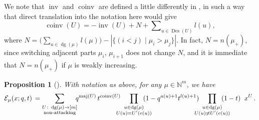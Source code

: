 \documentclass[12pt]{amsart}
\newtheorem{prop}[thm]{Proposition}
\theoremstyle{definition}
\theoremstyle{remark}
\newcommand{\NN}{{\mathbb N}}
\newcommand{\Ecal}{{\mathcal E}}
\DeclareMathOperator{\dg}{dg}
\DeclareMathOperator{\inv}{inv}
\DeclareMathOperator{\coinv}{coinv}
\DeclareMathOperator{\maj}{maj}
\DeclareMathOperator{\Des}{Des}
\begin{document}
We note that $\inv $ and $\coinv $ are defined a little differently in
\cite{HagHaiLo08}, in such a way that direct translation into the
notation here would give
\begin{equation}\label{e:coinv-original}
\coinv (U)  = - \inv (U) + N + \sum \nolimits_{u\in \Des (U)} l(u),
\end{equation}
where $N = \bigl(\sum _{u\in \dg (\mu )} l(\mu ) \bigr) - |\{(i<j)
\mid \mu _{i} >\mu _{j} \}|$.  In fact, $N = n(\mu _{+})$, since
switching adjacent parts $\mu _{i}$, $\mu _{i+1}$ does not change $N$,
and it is immediate that $N = n(\mu _{+})$ if $\mu $ is weakly
increasing.

\begin{prop}[{\cite[Corollary~3.5.2]{HagHaiLo08}}]\label{prop:original-HHL}
With notation as above, for any $\mu \in \NN ^{m}$, we have
\begin{equation}\label{e:original-HHL}
\Ecal _{\mu }(x;q,t)\, =
\sum _{\substack{U \colon \dg (\mu )\rightarrow [m]\\
\text{non-attacking}}} \hspace{-1ex}  q^{\maj (U)}\, t^{\coinv (U)}
\hspace{-2ex} \prod _{\substack{u\in \dg (\mu )\\ U(u) = U'(e(u))}}
\hspace{-3ex} (1 - q^{a(u)+1} t^{l(u)+1}) \hspace{-2ex}
\prod _{\substack{u\in \dg (\mu )\\
U(u) \not = U'(e(u))}} \hspace{-3ex} (1-t) \;\; x^{U}\, .
\end{equation}
\end{prop}
\end{document}
